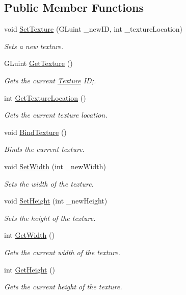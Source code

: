 \subsection*{Public Member Functions}
\begin{DoxyCompactItemize}
\item 
void \hyperlink{classfrontier_1_1_texture_aa77328fcbb46a524cc7c8bd6b149d3cc}{Set\+Texture} (G\+Luint \+\_\+new\+ID, int \+\_\+texture\+Location)
\begin{DoxyCompactList}\small\item\em Sets a new texture. \end{DoxyCompactList}\item 
G\+Luint \hyperlink{classfrontier_1_1_texture_ac6ca90a251f23a0fcbcf56ae7b3bb544}{Get\+Texture} ()
\begin{DoxyCompactList}\small\item\em Gets the current \hyperlink{classfrontier_1_1_texture}{Texture} ID;. \end{DoxyCompactList}\item 
int \hyperlink{classfrontier_1_1_texture_a93935a9af5c67d31eaf7c8074dbb13c5}{Get\+Texture\+Location} ()
\begin{DoxyCompactList}\small\item\em Gets the current texture location. \end{DoxyCompactList}\item 
void \hyperlink{classfrontier_1_1_texture_ae983ce4ddd78a5170e3beed65b17ae3f}{Bind\+Texture} ()
\begin{DoxyCompactList}\small\item\em Binds the current texture. \end{DoxyCompactList}\item 
void \hyperlink{classfrontier_1_1_texture_a53375bba8b0277c792c64d0246a10fd3}{Set\+Width} (int \+\_\+new\+Width)
\begin{DoxyCompactList}\small\item\em Sets the width of the texture. \end{DoxyCompactList}\item 
void \hyperlink{classfrontier_1_1_texture_aa927deb382a4b19374edc030c76ed1c6}{Set\+Height} (int \+\_\+new\+Height)
\begin{DoxyCompactList}\small\item\em Sets the height of the texture. \end{DoxyCompactList}\item 
int \hyperlink{classfrontier_1_1_texture_acd83cfddc6017cf76ccc37294a9c38be}{Get\+Width} ()
\begin{DoxyCompactList}\small\item\em Gets the current width of the texture. \end{DoxyCompactList}\item 
int \hyperlink{classfrontier_1_1_texture_a55c5dc9f91d6d06abf32955de24290ae}{Get\+Height} ()
\begin{DoxyCompactList}\small\item\em Gets the current height of the texture. \end{DoxyCompactList}\end{DoxyCompactItemize}
